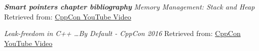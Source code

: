     \emph{\textbf{Smart pointers chapter bibliography}} 
    \emph{Memory Management: Stack and Heap}
    \newline
    Retrieved from: \href{https://icarus.cs.weber.edu/~dab/cs1410/textbook/4.Pointers/memory.html}{CppCon YouTube Video}
    
    \emph{Leak-freedom in C++ \dots By Default - CppCon 2016}
    \newline
    Retrieved from: \href{https://www.youtube.com/watch?v=JfmTagWcqoE&ab_channel=CppCon}{CppCon YouTube Video}
    
    
